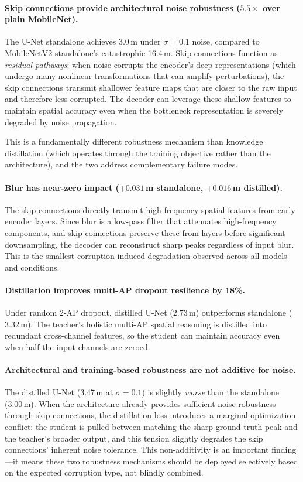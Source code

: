 \documentclass[11pt,a4paper]{article}
\begin{document}
\paragraph{Skip connections provide architectural noise robustness ($5.5\times$ over plain MobileNet).}
The U-Net standalone achieves 3.0\,m under $\sigma = 0.1$ noise, compared to MobileNetV2 standalone's catastrophic 16.4\,m.
Skip connections function as \emph{residual pathways}: when noise corrupts the encoder's deep representations (which undergo many nonlinear transformations that can amplify perturbations), the skip connections transmit shallower feature maps that are closer to the raw input and therefore less corrupted.
The decoder can leverage these shallow features to maintain spatial accuracy even when the bottleneck representation is severely degraded by noise propagation.

This is a fundamentally different robustness mechanism than knowledge distillation (which operates through the training objective rather than the architecture), and the two address complementary failure modes.

\paragraph{Blur has near-zero impact ($+0.031$\,m standalone, $+0.016$\,m distilled).}
The skip connections directly transmit high-frequency spatial features from early encoder layers.
Since blur is a low-pass filter that attenuates high-frequency components, and skip connections preserve these from layers before significant downsampling, the decoder can reconstruct sharp peaks regardless of input blur.
This is the smallest corruption-induced degradation observed across all models and conditions.

\paragraph{Distillation improves multi-AP dropout resilience by 18\%.}
Under random 2-AP dropout, distilled U-Net ($2.73$\,m) outperforms standalone ($3.32$\,m).
The teacher's holistic multi-AP spatial reasoning is distilled into redundant cross-channel features, so the student can maintain accuracy even when half the input channels are zeroed.

\paragraph{Architectural and training-based robustness are not additive for noise.}
The distilled U-Net (3.47\,m at $\sigma = 0.1$) is slightly \emph{worse} than the standalone (3.00\,m).
When the architecture already provides sufficient noise robustness through skip connections, the distillation loss introduces a marginal optimization conflict: the student is pulled between matching the sharp ground-truth peak and the teacher's broader output, and this tension slightly degrades the skip connections' inherent noise tolerance.
This non-additivity is an important finding---it means these two robustness mechanisms should be deployed selectively based on the expected corruption type, not blindly combined.
\end{document}
